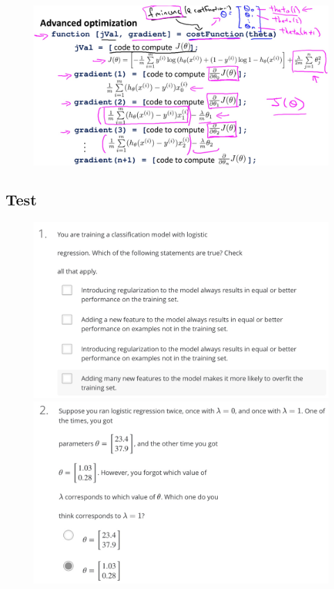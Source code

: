 \documentclass[12pt, A4,onecolumn]{article} %
\begin{document}
\begin{figure}[H]
	\centering
	\includegraphics[width=1\textwidth]{./Imagenes/regulLogicReg5}
\end{figure}

\newpage
\subsection{Test}


\begin{figure}[H]
  \includegraphics[width=\linewidth]{./Imagenes/testFRegul1}
\endminipage\hfill
{}
  \includegraphics[width=\linewidth]{./Imagenes/testFRegul2}
\endminipage\hfill
\end{figure}
\end{document}
